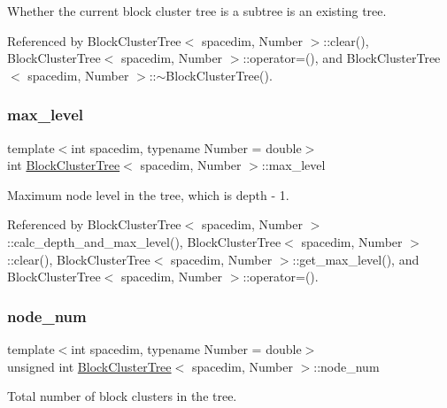 Whether the current block cluster tree is a subtree is an existing tree. 

Referenced by Block\+Cluster\+Tree$<$ spacedim, Number $>$\+::clear(), Block\+Cluster\+Tree$<$ spacedim, Number $>$\+::operator=(), and Block\+Cluster\+Tree$<$ spacedim, Number $>$\+::$\sim$\+Block\+Cluster\+Tree().

\mbox{\label{classBlockClusterTree_a9151f138713d01c53ac17f004c7e6b62}} 
\subsubsection{\texorpdfstring{max\+\_\+level}{max\_level}}
{\footnotesize\ttfamily template$<$int spacedim, typename Number = double$>$ \\
int \hyperlink{classBlockClusterTree}{Block\+Cluster\+Tree}$<$ spacedim, Number $>$\+::max\+\_\+level\hspace{0.3cm}{\ttfamily [private]}}

Maximum node level in the tree, which is {\ttfamily depth} -\/ 1. 

Referenced by Block\+Cluster\+Tree$<$ spacedim, Number $>$\+::calc\+\_\+depth\+\_\+and\+\_\+max\+\_\+level(), Block\+Cluster\+Tree$<$ spacedim, Number $>$\+::clear(), Block\+Cluster\+Tree$<$ spacedim, Number $>$\+::get\+\_\+max\+\_\+level(), and Block\+Cluster\+Tree$<$ spacedim, Number $>$\+::operator=().

\mbox{\label{classBlockClusterTree_a75757146cea0aa0e9271b760b1d76307}} 
\subsubsection{\texorpdfstring{node\+\_\+num}{node\_num}}
{\footnotesize\ttfamily template$<$int spacedim, typename Number = double$>$ \\
unsigned int \hyperlink{classBlockClusterTree}{Block\+Cluster\+Tree}$<$ spacedim, Number $>$\+::node\+\_\+num\hspace{0.3cm}{\ttfamily [private]}}

Total number of block clusters in the tree. 

